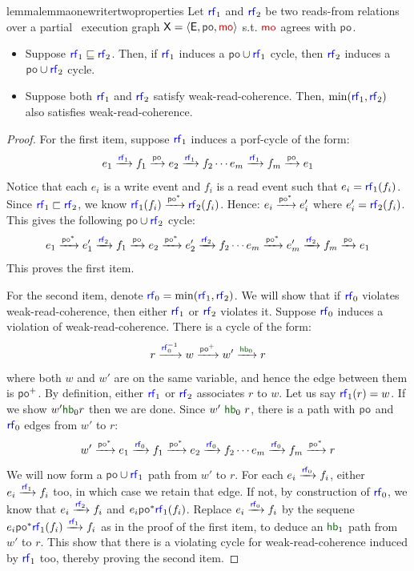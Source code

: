 \begin{restatable}{lemma}{lemmaonewritertwoproperties}
    \label{lem:onewriter-axioms-two-properties}
Let $\rf_1$ and $\rf_2$ be two reads-from relations over a partial \onewriter\ execution graph $\ex=\tuple{\E, \po, \mo}$ s.t. $\mo$ agrees with $\po$. 
\begin{itemize}
\item Suppose $\rf_1 \sqsubseteq \rf_2$. Then, if $\rf_1$ induces a $\po \cup \rf_1$ cycle, then $\rf_2$ induces a $\po \cup \rf_2$ cycle.
\item Suppose both $\rf_1$ and $\rf_2$ satisfy weak-read-coherence. Then,  $\min(\rf_1, \rf_2)$ also satisfies weak-read-coherence.
\end{itemize} 
\end{restatable}
\begin{proof}
For the first item, suppose $\rf_1$ induces a porf-cycle of the form:
\[ e_1 \xra{\rf_1} f_1 \xra{\po} e_2 \xra{\rf_1} f_2 \cdots e_m \xra{\rf_1} f_{m} \xra{\po} e_1\]
Notice that each $e_i$ is a write event and $f_i$ is a read event such that $e_i = \rf_1(f_i)$. Since $\rf_1 \sqsubset \rf_2$, we know $\rf_1(f_i) \xra{\po^*} \rf_2(f_i)$. Hence: $e_i \xra{\po^*} e'_i$ where $e'_i = \rf_2(f_i)$. This gives the following $\po \cup \rf_2$ cycle:
 \[ e_1 \xra{\po^*} e'_1 \xra{\rf_2} f_1 \xra{\po} e_2 \xra{\po^*} e'_2 \xra{\rf_2} f_2 \cdots e_m \xra{\po^*} e'_m \xra{\rf_2} f_{m} \xra{\po} e_1\]
 This proves the first item.

 For the second item, denote $\rf_0 = \min(\rf_1, \rf_2)$. We will show that if $\rf_0$ violates weak-read-coherence, then either $\rf_1$ or $\rf_2$ violates it. Suppose $\rf_0$ induces a violation of weak-read-coherence. There is a cycle of the form:
 \[ r \xra{\rf_0^{-1}} w \xra{\po^+} w' \xra{\hb_0} r \]
 where both $w$ and $w'$ are on the same variable, and hence the edge between them is $\po^+$. By definition, either $\rf_1$ or $\rf_2$ associates $r$ to $w$. Let us say $\rf_1(r) = w$. If we show $w' \hb_0 r$ then we are done. Since $w'~\hb_0~r$, there is a path with $\po$ and $\rf_0$ edges from $w'$ to $r$:
 \[w' \xra{\po^*} e_1 \xra{\rf_0} f_1 \xra{\po^*} e_2 \xra{\rf_0} f_2 \cdots e_m \xra{\rf_0} f_m \xra{\po^*} r \]
 We will now form a $\po \cup \rf_1$ path from $w'$ to $r$. For each $e_i \xra{\rf_0} f_i$, either $e_i \xra{\rf_1} f_i$ too, in which case we retain that edge. If not, by construction of $\rf_0$, we know that $e_i \xra{\rf_2} f_i$ and $e_i \po^* \rf_1(f_i)$. Replace $e_i \xra{\rf_0} f_i$ by the sequene $e_i \po^* \rf_1(f_i) \xra{\rf_1} f_i$ as in the proof of the first item, to deduce an $\hb_1$ path from $w'$ to $r$. This show that there is a violating cycle for weak-read-coherence induced by $\rf_1$ too, thereby proving the second item. 
\end{proof}
